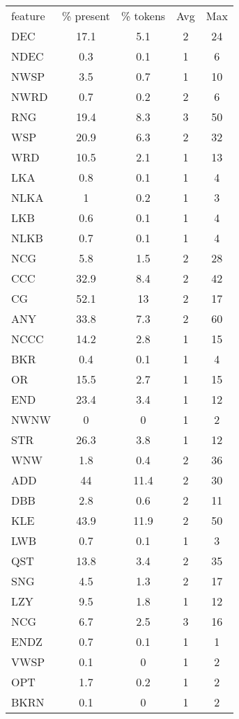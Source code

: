 \begin{center}
\begin{tabular}{lcccc}
\toprule
feature & \% present & \% tokens & Avg & Max \\ 
DEC & 17.1 & 5.1 & 2 & 24 \\ 
\midrule
NDEC & 0.3 & 0.1 & 1 & 6 \\ 
\midrule
NWSP & 3.5 & 0.7 & 1 & 10 \\ 
\midrule
NWRD & 0.7 & 0.2 & 2 & 6 \\ 
\midrule
RNG & 19.4 & 8.3 & 3 & 50 \\ 
\midrule
WSP & 20.9 & 6.3 & 2 & 32 \\ 
\midrule
WRD & 10.5 & 2.1 & 1 & 13 \\ 
\midrule
LKA & 0.8 & 0.1 & 1 & 4 \\ 
\midrule
NLKA & 1 & 0.2 & 1 & 3 \\ 
\midrule
LKB & 0.6 & 0.1 & 1 & 4 \\ 
\midrule
NLKB & 0.7 & 0.1 & 1 & 4 \\ 
\midrule
NCG & 5.8 & 1.5 & 2 & 28 \\ 
\midrule
CCC & 32.9 & 8.4 & 2 & 42 \\ 
\midrule
CG & 52.1 & 13 & 2 & 17 \\ 
\midrule
ANY & 33.8 & 7.3 & 2 & 60 \\ 
\midrule
NCCC & 14.2 & 2.8 & 1 & 15 \\ 
\midrule
BKR & 0.4 & 0.1 & 1 & 4 \\ 
\midrule
OR & 15.5 & 2.7 & 1 & 15 \\ 
\midrule
END & 23.4 & 3.4 & 1 & 12 \\ 
\midrule
NWNW & 0 & 0 & 1 & 2 \\ 
\midrule
STR & 26.3 & 3.8 & 1 & 12 \\ 
\midrule
WNW & 1.8 & 0.4 & 2 & 36 \\ 
\midrule
ADD & 44 & 11.4 & 2 & 30 \\ 
\midrule
DBB & 2.8 & 0.6 & 2 & 11 \\ 
\midrule
KLE & 43.9 & 11.9 & 2 & 50 \\ 
\midrule
LWB & 0.7 & 0.1 & 1 & 3 \\ 
\midrule
QST & 13.8 & 3.4 & 2 & 35 \\ 
\midrule
SNG & 4.5 & 1.3 & 2 & 17 \\ 
\midrule
LZY & 9.5 & 1.8 & 1 & 12 \\ 
\midrule
NCG & 6.7 & 2.5 & 3 & 16 \\ 
\midrule
ENDZ & 0.7 & 0.1 & 1 & 1 \\ 
\midrule
VWSP & 0.1 & 0 & 1 & 2 \\ 
\midrule
OPT & 1.7 & 0.2 & 1 & 2 \\ 
\midrule
BKRN & 0.1 & 0 & 1 & 2 \\ 
\midrule
\bottomrule
\end{tabular}
\end{center}
